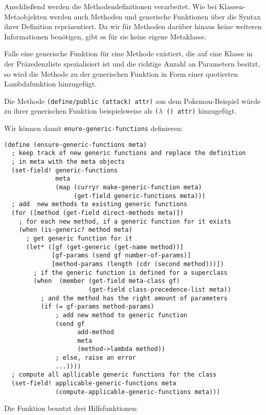 Anschließend werden die Methodendefinitionen verarbeitet. Wie bei Klas\-sen-Me\-ta\-ob\-jek\-ten werden auch Methoden und generische Funktionen über die Syntax ihrer Definition repräsentiert. Da wir für Methoden darüber hinaus keine weiteren Informationen benötigen, gibt es für sie keine eigene Metaklasse. 

Falls eine generische Funktion für eine Methode existiert, die auf eine Klasse in der Präzedenzliste spezialisiert ist und die richtige Anzahl an Parametern besitzt, so wird die Methode zu der generischen Funktion in Form einer quotierten Lambdafunktion hinzugefügt. 

Die Methode \texttt{(define/public (attack) {\textquotesingle}attr)} aus dem Pokemon-Beispiel würde zu ihrer generischen Funktion beispielsweise als \texttt{($\lambda$ () {\textquotesingle}attr)} hinzugefügt. 

Wir können damit \texttt{enure-generic-functions} definieren:

\begin{lstlisting}
(define (ensure-generic-functions meta)
  ; keep track of new generic functions and replace the definition
  ; in meta with the meta objects
  (set-field! generic-functions
              meta
              (map (curryr make-generic-function meta)
                   (get-field generic-functions meta)))
  ; add  new methods to existing generic functions
  (for ([method (get-field direct-methods meta)])
    ; for each new method, if a generic function for it exists
    (when (is-generic? method meta)
      ; get generic function for it
      (let* ([gf (get-generic (get-name method))]
             [gf-params (send gf number-of-params)]
             [method-params (length (cdr (second method)))])
        ; if the generic function is defined for a superclass
        (when  (member (get-field meta-class gf)
                       (get-field class-precedence-list meta))
          ; and the method has the right amount of parameters
          (if (= gf-params method-params)
              ; add new method to generic function
              (send gf
                    add-method
                    meta
                    (method->lambda method))
              ; else, raise an error
              ...))))
  ; compute all apllicable generic functions for the class
  (set-field! applicable-generic-functions meta
              (compute-applicable-generic-functions meta)))
\end{lstlisting}

Die Funktion benutzt drei Hilfsfunktionen:

